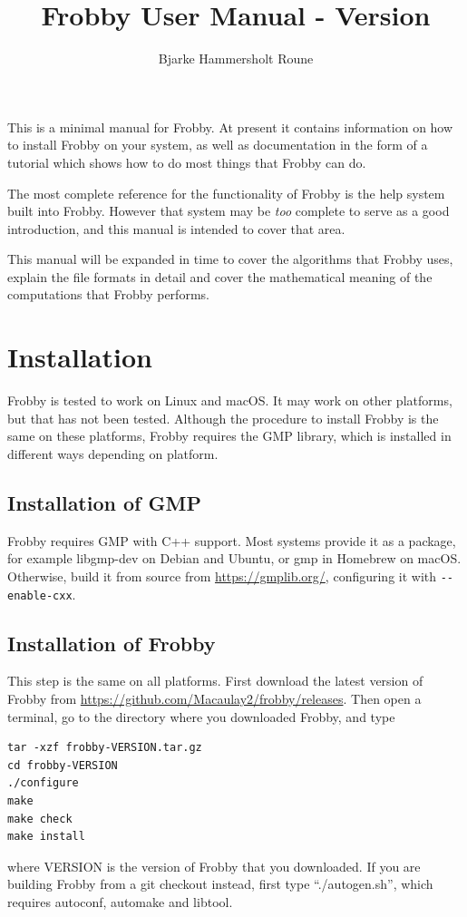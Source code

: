 \documentclass{amsart}
\author{Bjarke Hammersholt Roune}
\title{Frobby User Manual - Version \frobbyVersion}
\theoremstyle{definition}
\begin{document}
\maketitle

\tableofcontents

This is a minimal manual for Frobby. At present it contains
information on how to install Frobby on your system, as well as
documentation in the form of a tutorial which shows how to do most
things that Frobby can do.

The most complete reference for the functionality of Frobby is the
help system built into Frobby. However that system may be \emph{too}
complete to serve as a good introduction, and this manual is intended
to cover that area.

This manual will be expanded in time to cover the algorithms that
Frobby uses, explain the file formats in detail and cover the
mathematical meaning of the computations that Frobby performs.

\section{Installation}

Frobby is tested to work on Linux and macOS. It may work on other
platforms, but that has not been tested. Although the procedure to
install Frobby is the same on these platforms, Frobby requires the GMP
library, which is installed in different ways depending on platform.

\subsection{Installation of GMP}

Frobby requires GMP with C++ support. Most systems provide it as a
package, for example libgmp-dev on Debian and Ubuntu, or gmp in
Homebrew on macOS. Otherwise, build it from source from
\url{https://gmplib.org/}, configuring it with \verb|--enable-cxx|.

\subsection{Installation of Frobby}

This step is the same on all platforms. First download the latest
version of Frobby from \url{https://github.com/Macaulay2/frobby/releases}.
Then open a terminal, go to the directory where you downloaded Frobby,
and type
\begin{verbatim}
tar -xzf frobby-VERSION.tar.gz
cd frobby-VERSION
./configure
make
make check
make install
\end{verbatim}
where VERSION is the version of Frobby that you downloaded. If you
are building Frobby from a git checkout instead, first type
``./autogen.sh'', which requires autoconf, automake and libtool.
\end{document}
